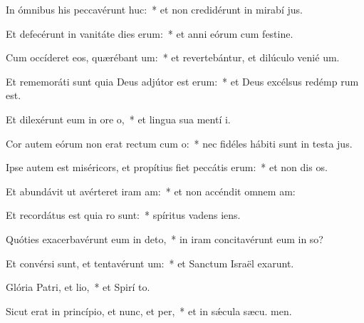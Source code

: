 \item In ómnibus his peccavérunt huc:~* et non credidérunt in mirabí jus.
\item Et defecérunt in vanitáte dies erum:~* et anni eórum cum festine.
\item Cum occíderet eos, quærébant um:~* et revertebántur, et dilúculo venié  um.
\item Et rememoráti sunt quia Deus adjútor est erum:~* et Deus excélsus redémp rum est.
\item Et dilexérunt eum in ore o,~* et lingua sua mentí  i.
\item Cor autem eórum non erat rectum cum o:~* nec fidéles hábiti sunt in testa jus.
\item Ipse autem est miséricors, et propítius fiet peccátis erum:~* et non dis os.
\item Et abundávit ut avérteret iram am:~* et non accéndit omnem  am:
\item Et recordátus est quia ro sunt:~* spíritus vadens   iens.
\item Quóties exacerbavérunt eum in deto,~* in iram concitavérunt eum in so?
\item Et convérsi sunt, et tentavérunt um:~* et Sanctum Israël exarunt.
\item Glória Patri, et lio,~* et Spirí to.
\item Sicut erat in princípio, et nunc, et per,~* et in sǽcula sæcu. men.

